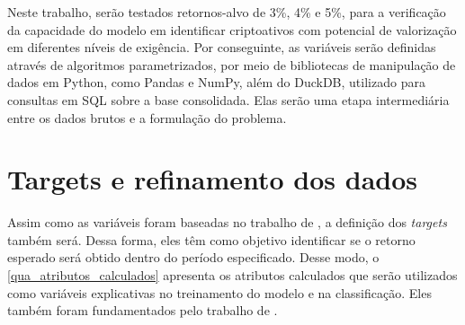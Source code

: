 Neste trabalho, serão testados retornos-alvo de 3\%, 4\% e 5\%, para a verificação da capacidade do modelo em identificar criptoativos com potencial de valorização em diferentes níveis de exigência. Por conseguinte, as variáveis serão definidas através de algoritmos parametrizados, por meio de bibliotecas de manipulação de dados em Python, como Pandas e NumPy, além do DuckDB, utilizado para consultas em SQL sobre a base consolidada. Elas serão uma etapa intermediária entre os dados brutos e a formulação do problema.

\section{Targets e refinamento dos dados}
\label{sec_targets_e_refinamento}

Assim como as variáveis foram baseadas no trabalho de , a definição dos \textit{targets} também será. Dessa forma, eles têm como objetivo identificar se o retorno esperado será obtido dentro do período especificado. Desse modo, o \autoref{qua_atributos_calculados} apresenta os atributos calculados que serão utilizados como variáveis explicativas no treinamento do modelo e na classificação. Eles também foram fundamentados pelo trabalho de .

